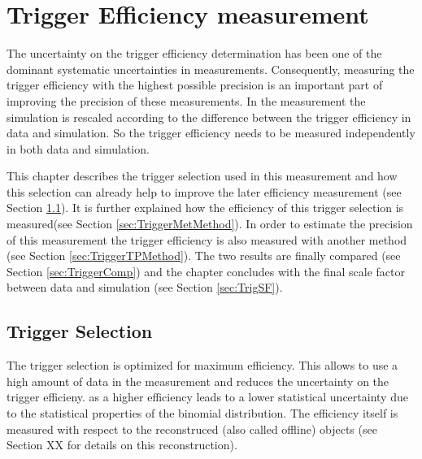 
\chapter{Trigger Efficiency measurement}  %

The uncertainty on the trigger efficiency determination has been one of the dominant systematic uncertainties in \sttbar measurements.
Consequently, measuring the trigger efficiency with the highest possible precision is an important part of improving the precision of these
measurements. In the measurement the simulation is rescaled according to the difference between the trigger efficiency in data and simulation. 
So the trigger efficiency needs to be measured independently in both data and simulation.

This chapter describes the trigger selection used in this measurement and how this selection can already help to improve
the later efficiency measurement (see Section \ref{sec:TriggerSel}). It is further explained how the efficiency of this trigger selection is measured(see Section \ref{sec:TriggerMetMethod}). In order to estimate the precision of this measurement the trigger efficiency
is also measured with another method (see Section \ref{sec:TriggerTPMethod}). The two results are finally compared (see Section \ref{sec:TriggerComp}) and the chapter concludes with the final scale factor between data and simulation (see Section \ref{sec:TrigSF}). 



\section{Trigger Selection} %
\label{sec:TriggerSel}

The trigger selection is optimized for maximum efficiency. This allows to use a high amount of data in the measurement and reduces the uncertainty on the trigger efficieny. as a higher efficiency leads to a lower statistical uncertainty due to the statistical properties of the binomial distribution.
The efficiency itself is measured with respect to the reconstruced (also called offline) objects (see Section XX for details
on this reconstruction).

